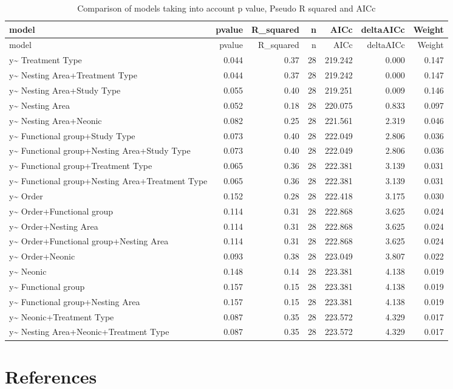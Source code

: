 \documentclass[]{elsarticle} %
\begin{document}
\begin{longtable}[c]{@{}lrrrrrr@{}}
\caption{Comparison of models taking into account p value, Pseudo R
squared and AICc}\tabularnewline
\toprule
model & pvalue & R\_squared & n & AICc & deltaAICc &
Weight\tabularnewline
\midrule
\endfirsthead
\toprule
model & pvalue & R\_squared & n & AICc & deltaAICc &
Weight\tabularnewline
\midrule
\endhead
y\textasciitilde{} Treatment Type & 0.044 & 0.37 & 28 & 219.242 & 0.000
& 0.147\tabularnewline
y\textasciitilde{} Nesting Area+Treatment Type & 0.044 & 0.37 & 28 &
219.242 & 0.000 & 0.147\tabularnewline
y\textasciitilde{} Nesting Area+Study Type & 0.055 & 0.40 & 28 & 219.251
& 0.009 & 0.146\tabularnewline
y\textasciitilde{} Nesting Area & 0.052 & 0.18 & 28 & 220.075 & 0.833 &
0.097\tabularnewline
y\textasciitilde{} Nesting Area+Neonic & 0.082 & 0.25 & 28 & 221.561 &
2.319 & 0.046\tabularnewline
y\textasciitilde{} Functional group+Study Type & 0.073 & 0.40 & 28 &
222.049 & 2.806 & 0.036\tabularnewline
y\textasciitilde{} Functional group+Nesting Area+Study Type & 0.073 &
0.40 & 28 & 222.049 & 2.806 & 0.036\tabularnewline
y\textasciitilde{} Functional group+Treatment Type & 0.065 & 0.36 & 28 &
222.381 & 3.139 & 0.031\tabularnewline
y\textasciitilde{} Functional group+Nesting Area+Treatment Type & 0.065
& 0.36 & 28 & 222.381 & 3.139 & 0.031\tabularnewline
y\textasciitilde{} Order & 0.152 & 0.28 & 28 & 222.418 & 3.175 &
0.030\tabularnewline
y\textasciitilde{} Order+Functional group & 0.114 & 0.31 & 28 & 222.868
& 3.625 & 0.024\tabularnewline
y\textasciitilde{} Order+Nesting Area & 0.114 & 0.31 & 28 & 222.868 &
3.625 & 0.024\tabularnewline
y\textasciitilde{} Order+Functional group+Nesting Area & 0.114 & 0.31 &
28 & 222.868 & 3.625 & 0.024\tabularnewline
y\textasciitilde{} Order+Neonic & 0.093 & 0.38 & 28 & 223.049 & 3.807 &
0.022\tabularnewline
y\textasciitilde{} Neonic & 0.148 & 0.14 & 28 & 223.381 & 4.138 &
0.019\tabularnewline
y\textasciitilde{} Functional group & 0.157 & 0.15 & 28 & 223.381 &
4.138 & 0.019\tabularnewline
y\textasciitilde{} Functional group+Nesting Area & 0.157 & 0.15 & 28 &
223.381 & 4.138 & 0.019\tabularnewline
y\textasciitilde{} Neonic+Treatment Type & 0.087 & 0.35 & 28 & 223.572 &
4.329 & 0.017\tabularnewline
y\textasciitilde{} Nesting Area+Neonic+Treatment Type & 0.087 & 0.35 &
28 & 223.572 & 4.329 & 0.017\tabularnewline
\bottomrule
\end{longtable}

\section*{References}\label{references}
\end{document}
